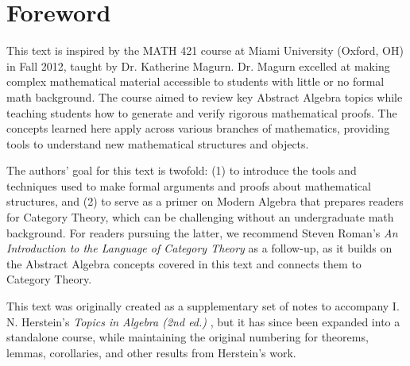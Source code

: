 \vspace{-0.2in}
\section{Foreword}
This text is inspired by the MATH 421 course at Miami University (Oxford, OH) in Fall 2012, taught by Dr. Katherine Magurn. Dr. Magurn excelled at making complex mathematical material accessible to students with little or no formal math background. The course aimed to review key Abstract Algebra topics while teaching students how to generate and verify rigorous mathematical proofs. The concepts learned here apply across various branches of mathematics, providing tools to understand new mathematical structures and objects.

The authors' goal for this text is twofold: (1) to introduce the tools and techniques used to make formal arguments and proofs about mathematical structures, and (2) to serve as a primer on Modern Algebra that prepares readers for Category Theory, which can be challenging without an undergraduate math background. For readers pursuing the latter, we recommend Steven Roman's \textit{An Introduction to the Language of Category Theory} \cite{roman2017introduction} as a follow-up, as it builds on the Abstract Algebra concepts covered in this text and connects them to Category Theory.

This text was originally created as a supplementary set of notes to accompany I. N. Herstein's \textit{Topics in Algebra (2nd ed.)} \cite{herstein1991topics}, but it has since been expanded into a standalone course, while maintaining the original numbering for theorems, lemmas, corollaries, and other results from Herstein's work.

